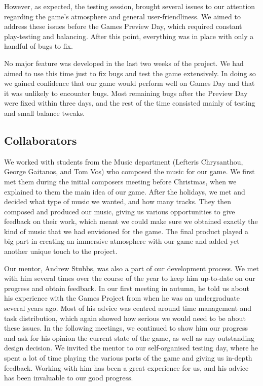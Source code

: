 \documentclass[a4paper,11pt]{article}
\begin{document}
However, as expected, the testing session, brought several issues to our attention regarding the game’s atmosphere and general user-friendliness. We aimed to address these issues before the Games Preview Day, which required constant play-testing and balancing. After this point, everything was in place with only a handful of bugs to fix.

No major feature was developed in the last two weeks of the project. We had aimed to use this time just to fix bugs and test the game extensively. In doing so we gained confidence that our game would perform well on Games Day and that it was unlikely to encounter bugs. Most remaining bugs after the Preview Day were fixed within three days, and the rest of the time consisted mainly of testing and small balance tweaks.


\subsection{Collaborators}
We worked with students from the Music department (Lefteris Chrysanthou, George Gaitanos, and Tom Vos) who composed the music for our game. We first met them during the initial composers meeting before Christmas, when we explained to them the main idea of our game. After the holidays, we met and decided what type of music we wanted, and how many tracks. They then composed and produced our music, giving us various opportunities to give feedback on their work, which meant we could make sure we obtained exactly the kind of music that we had envisioned for the game. The final product played a big part in creating an immersive atmosphere with our game and added yet another unique touch to the project.

Our mentor, Andrew Stubbs, was also a part of our development process. We met with him several times over the course of the year to keep him up-to-date on our progress and obtain feedback. In our first meeting in autumn, he told us about his experience with the Games Project from when he was an undergraduate several years ago. Most of his advice was centred around time management and task distribution, which again showed how serious we would need to be about these issues. In the following meetings, we continued to show him our progress and ask for his opinion the current state of the game, as well as any outstanding design decision. We invited the mentor to our self-organised testing day, where he spent a lot of time playing the various parts of the game and giving us in-depth feedback. Working with him has been a great experience for us, and his advice has been invaluable to our good progress.
\end{document}
